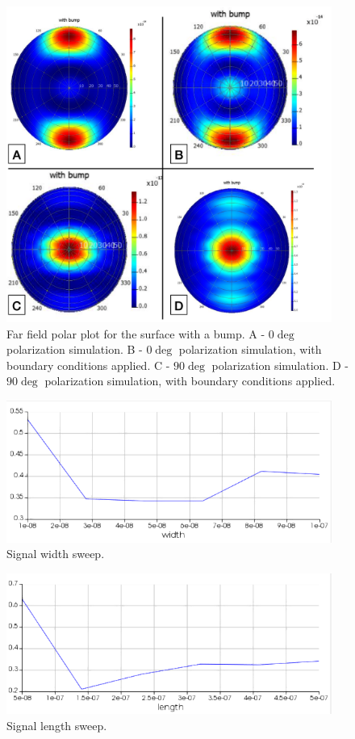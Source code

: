 \documentclass[11pt,a4paper]{article}
\begin{document}
\begin{figure}
        \includegraphics[width=0.95\textwidth]{5.png}
        \caption{Far field polar plot  for the surface with a bump. A - $0\deg$ polarization simulation. B - $0\deg$ polarization simulation, with boundary conditions applied. C - $90\deg$ polarization simulation. D - $90\deg$ polarization simulation, with boundary conditions applied.}
\end{figure}

\begin{figure}
        \includegraphics[width=0.95\textwidth]{signal-width_sweep.png}
        \caption{Signal width sweep.}
\end{figure}
\begin{figure}
        \includegraphics[width=0.95\textwidth]{signal-length_sweep.png}
        \caption{Signal length sweep.}
\end{figure}
\end{document}
